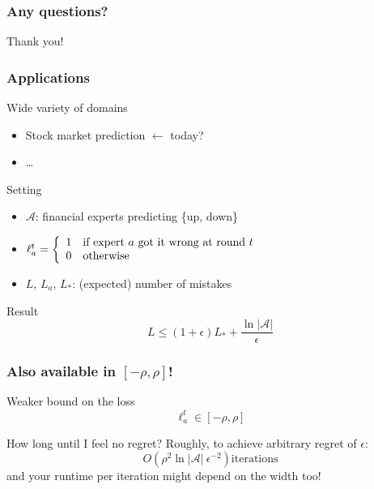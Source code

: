 \documentclass{beamer}
\begin{document}
\begin{frame}
    \frametitle{Any questions?}

    \begin{center}
        \huge{Thank you!}
    \end{center}
\end{frame}

\begin{frame}
    \frametitle{Applications}

    \begin{block}{Wide variety of domains}
        \begin{itemize}
            \item Stock market prediction $\leftarrow$ \alert{today?}
            \item \ldots
        \end{itemize}
    \end{block}

    \begin{block}{Setting}
        \begin{itemize}
            \item $\mathcal{A}$: financial experts predicting \{up, down\}
            \item $\ell_a^t = \left\{
        \begin{array}{l l}
        1 & \text{if expert $a$ got it wrong at round $t$}\\
        0 & \text{otherwise}
        \end{array}
        \right.$
    \item $L$, $L_a$, $L_*$: (expected) number of mistakes
\end{itemize}
    \end{block}

    \begin{block}{Result}
        \begin{equation*}
            L \leq (1 + \epsilon)L_* + \dfrac{\ln |\mathcal{A}|}{\epsilon}
        \end{equation*}
    \end{block}
    

\end{frame}

\begin{frame}
    \frametitle{Also available in $[-\rho, \rho]$!}

    \begin{block}{Weaker bound on the loss}
        \begin{equation*}
            \ell_a^t \in [-\rho, \rho]
        \end{equation*}
    \end{block}

    \begin{block}{How long until I feel no regret?}
        Roughly, to achieve arbitrary regret of $\epsilon$:
        \begin{equation*}
        O(\rho^2 \ln |\mathcal{A}|~\epsilon^{-2}) \text{iterations}
        \end{equation*}
        and your runtime per iteration might depend on the width too!
    \end{block}

\end{frame}
\end{document}
